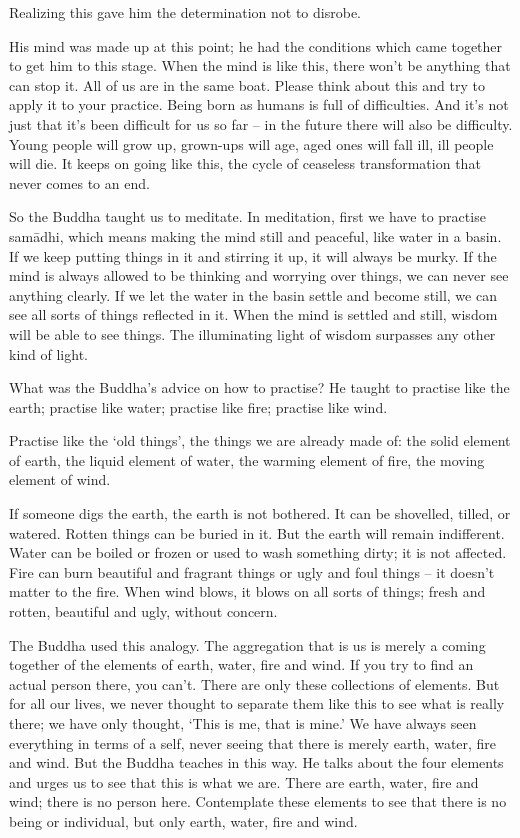 Realizing this gave him the determination not to disrobe.

His mind was made up at this point; he had the conditions which came together to get him to this stage. When the mind is like this, there won't be anything that can stop it. All of us are in the same boat. Please think about this and try to apply it to your practice. Being born as humans is full of difficulties. And it's not just that it's been difficult for us so far -- in the future there will also be difficulty. Young people will grow up, grown-ups will age, aged ones will fall ill, ill people will die. It keeps on going like this, the cycle of ceaseless transformation that never comes to an end.

So the Buddha taught us to meditate. In meditation, first we have to practise sam\=adhi, which means making the mind still and peaceful, like water in a basin. If we keep putting things in it and stirring it up, it will always be murky. If the mind is always allowed to be thinking and worrying over things, we can never see anything clearly. If we let the water in the basin settle and become still, we can see all sorts of things reflected in it. When the mind is settled and still, wisdom will be able to see things. The illuminating light of wisdom surpasses any other kind of light.

What was the Buddha's advice on how to practise? He taught to practise like the earth; practise like water; practise like fire; practise like wind.

Practise like the `old things', the things we are already made of: the solid element of earth, the liquid element of water, the warming element of fire, the moving element of wind.

If someone digs the earth, the earth is not bothered. It can be shovelled, tilled, or watered. Rotten things can be buried in it. But the earth will remain indifferent. Water can be boiled or frozen or used to wash something dirty; it is not affected. Fire can burn beautiful and fragrant things or ugly and foul things -- it doesn't matter to the fire. When wind blows, it blows on all sorts of things; fresh and rotten, beautiful and ugly, without concern.

The Buddha used this analogy. The aggregation that is us is merely a coming together of the elements of earth, water, fire and wind. If you try to find an actual person there, you can't. There are only these collections of elements. But for all our lives, we never thought to separate them like this to see what is really there; we have only thought, `This is me, that is mine.' We have always seen everything in terms of a self, never seeing that there is merely earth, water, fire and wind. But the Buddha teaches in this way. He talks about the four elements and urges us to see that this is what we are. There are earth, water, fire and wind; there is no person here. Contemplate these elements to see that there is no being or individual, but only earth, water, fire and wind.

